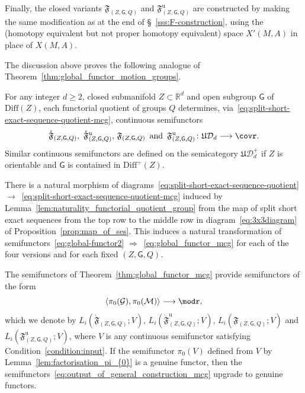 \documentclass[AHL,Unicode,published]{cedram}
\newcommand{\Diff}{\mathrm{Diff}}
\newcommand{\Int}{\mathring}
\newcommand{\unt}{\mathrm{u}}
\newcommand{\fF}{\mathfrak{F}}
\newcommand{\fU}{\ensuremath{\mathfrak{U}}}
\newcommand{\sG}{\mathsf{G}}
\newcommand{\cD}{\mathcal{D}}
\newcommand{\cG}{\mathcal{G}}
\newcommand{\cM}{\mathcal{M}}
\newcommand{\bR}{\mathbb{R}}
\newcommand{\too}{\ensuremath{\longrightarrow}}
\renewcommand{\geq}{\geqslant}
\begin{document}
Finally, the closed variants $\fF_{(Z,\sG,Q)}$ and $\fF^{\unt}_{(Z,\sG,Q)}$ are constructed by making the same modification as at the end of \S~\ref{sss:F-construction}, using the (homotopy equivalent but not proper homotopy equivalent) space $X'(M,A)$ in place of $X(M,A)$.

The discussion above proves the following analogue of Theorem~\ref{thm:global_functor_motion_groups}.

\begin{theo}\label{thm:global_functor_mcg}
For any integer $d \geq 2$, closed submanifold $Z \subset \bR^d$ and open subgroup $\sG$ of $\Diff(Z)$, each functorial quotient of groups $Q$ determines, via~\eqref{eq:split-short-exact-sequence-quotient-mcg}, continuous semifunctors
\begin{equation}\label{eq:global_functor_mcg}
\Int{\fF}_{(Z,\sG,Q)},\,\,\Int{\fF}^{\unt}_{(Z,\sG,Q)},\,\fF_{(Z,\sG,Q)}\, \text{ and }\, \fF^{\unt}_{(Z,\sG,Q)} \colon \fU\cD_{d} \too \covr.
\end{equation}
Similar continuous semifunctors are defined on the semicategory $\fU\cD_{d}^{+}$ if $Z$ is orientable and $\sG$ is contained in $\Diff^{+}(Z)$.
\end{theo}

\begin{rema}
There is a natural morphism of diagrams~\eqref{eq:split-short-exact-sequence-quotient} $\to$~\eqref{eq:split-short-exact-sequence-quotient-mcg} induced by Lemma~\ref{lem:naturality_functorial_quotient_group} from the map of split short exact sequences from the top row to the middle row in diagram~\eqref{eq:3x3diagram} of Proposition~\ref{prop:map_of_ses}. This induces a natural transformation of semifunctors~\eqref{eq:global-functor2} $\Rightarrow$~\eqref{eq:global_functor_mcg} for each of the four versions and for each fixed $(Z,\sG,Q)$.
\end{rema}

\begin{coro}\label{coro:def_homological_rep_functor_mcg}
The semifunctors of Theorem~\ref{thm:global_functor_mcg} provide semifunctors of the form
\begin{equation}\label{eq:output_of_general_construction_mcg}
\langle \pi_{0}(\cG), \pi_{0}(\cM) \rangle \too \modr,
\end{equation}
which we denote by $L_{i}(\Int{\fF}_{(Z,\sG,Q)};V)$, $L_{i}(\Int{\fF}^{\unt}_{(Z,\sG,Q)};V)$, $L_{i}(\fF_{(Z,\sG,Q)};V)$ and $L_{i}(\fF^{\unt}_{(Z,\sG,Q)};V)$, where $V$ is any continuous semifunctor satisfying Condition~\ref{condition:input}. If the semifunctor $\pi_{0}(V)$ defined from $V$ by Lemma~\ref{lem:factorisation_pi_{0}} is a genuine functor, then the semifunctors~\eqref{eq:output_of_general_construction_mcg} upgrade to genuine functors.
\end{coro}
\end{document}
